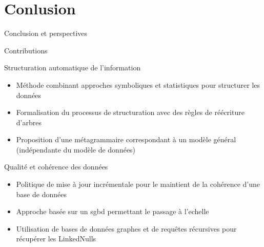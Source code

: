 \documentclass[english,french,table,aspectratio=43]{beamer}
\renewcommand{\_}{\ifincsname_\else\legacyunderscore\fi}
\begin{document}

%

\section{Conlusion}

\begin{frame}{}
    \begin{block}{}
        \Huge
        \centering
        \vspace{1em}
        Conclusion et perspectives
        \vspace{1em}
    \end{block}
\end{frame}

\begin{frame}{Contributions}
    \begin{block}{Structuration automatique de l'information}
        \begin{itemize}
            \item Méthode combinant approches symboliques et statistiques pour structurer les données
            \item Formalisation du processus de structuration avec des règles de réécriture d'arbres
            \item Proposition d'une métagrammaire correspondant à un modèle général (indépendante du modèle de données)
        \end{itemize}
    \end{block}
    \begin{block}{Qualité et cohérence des données}
        \begin{itemize}
            \item Politique de mise à jour incrémentale pour le maintient de la cohérence d'une base de données
            \item Approche basée sur un \acrshort{sgbd} permettant le passage à l'echelle
            \item Utilisation de bases de données graphes et de requêtes récursives pour récupérer les LinkedNulls
        \end{itemize}
    \end{block}
\end{frame}
\end{document}
